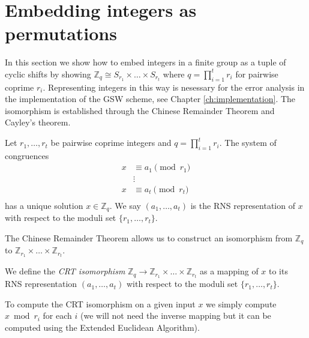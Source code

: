\section{Embedding integers as permutations}
In this section we show how to embed integers in a finite group as a tuple of cyclic shifts by showing $\mathbb{Z}_q \cong S_{r_1} \times \dots \times S_{r_t}$ where $q = \prod_{i=1}^t r_i$ for pairwise coprime $r_i$. Representing integers in this way is nesessary for the error analysis in the implementation of the GSW scheme, see Chapter \ref{ch:implementation}. The isomorphism is established through the Chinese Remainder Theorem and Cayley's theorem.
\begin{theorem}
    Let $r_1, \dots, r_t$ be pairwise coprime integers and $q = \prod_{i=1}^t r_i$.
    The system of congruences
    \begin{equation*}
    \begin{array}{rl}
        x & \equiv a_1 \pmod{r_1} \\
        &  \vdots \\
        x & \equiv a_t \pmod{r_t} \\
    \end{array}
    \end{equation*}
    has a unique solution $x \in \mathbb{Z}_q$.
    We say $(a_1, \dots, a_t)$ is the RNS representation of $x$ with respect to the moduli set $\{r_1, \dots, r_t\}$.
\end{theorem}
The Chinese Remainder Theorem allows us to construct an isomorphism from $\mathbb{Z}_q$ to $\mathbb{Z}_{r_1} \times \dots \times \mathbb{Z}_{r_t}$.
\begin{definition}
    We define the \textit{CRT isomorphism} $\mathbb{Z}_q \rightarrow \mathbb{Z}_{r_1} \times \dots \times \mathbb{Z}_{r_t}$ as a mapping of $x$ to its RNS representation $(a_1, \dots, a_t)$ with respect to the moduli set $\{r_1, \dots, r_t\}$.
\end{definition}
\begin{remark}
    To compute the CRT isomorphism on a given input $x$ we simply compute $x \bmod r_i$ for each $i$ (we will not need the inverse mapping but it can be computed using the Extended Euclidean Algorithm).
\end{remark}
